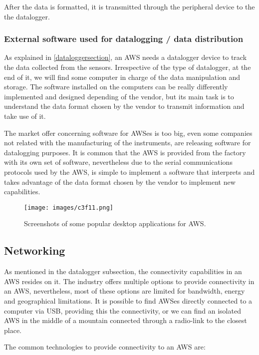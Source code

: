 {After the data is formatted, it is transmitted through the peripheral device to the the datalogger.

\subsubsection{External software used for datalogging / data distribution}

As explained in \ref{dataloggersection}, an \gls{AWS} needs a datalogger device to track the data collected from the sensors. Irrespective of the type of datalogger, at the end of it, we will find some computer in charge of the data manipulation and storage. The software installed on the computers can be really differently implemented and designed depending of the vendor, but its main task is to understand the data format chosen by the vendor to transmit information and take use of it.

The market offer concerning software for \gls{AWS}es is too big, even some companies not related with the manufacturing of the instruments, are releasing software for datalogging purposes. It is common that the \gls{AWS} is provided from the factory with its own set of software, nevertheless due to the serial communications protocols used by the \gls{AWS}, is simple to implement a software that interprets and takes advantage of the data format chosen by the vendor to implement new capabilities.

\begin{figure}[H]
\centerline{\texttt{[image: images/c3f11.png]}}
\caption{Screenshots of some popular desktop applications for \protect \gls{AWS}.}
\end{figure}

\subsection{Networking}\label{3.1.4}

As mentioned in the datalogger subsection, the connectivity capabilities in an \gls{AWS} resides on it. The industry offers multiple options to provide connectivity in an \gls{AWS}, nevertheless, most of these options are limited for bandwidth, energy and geographical limitations. It is possible to find \gls{AWS}es directly connected to a computer via \gls{USB}, providing this the connectivity, or we can find an isolated \gls{AWS} in the middle of a mountain connected through a radio-link to the closest place. 

The common technologies to provide connectivity to an \gls{AWS} are:

}
